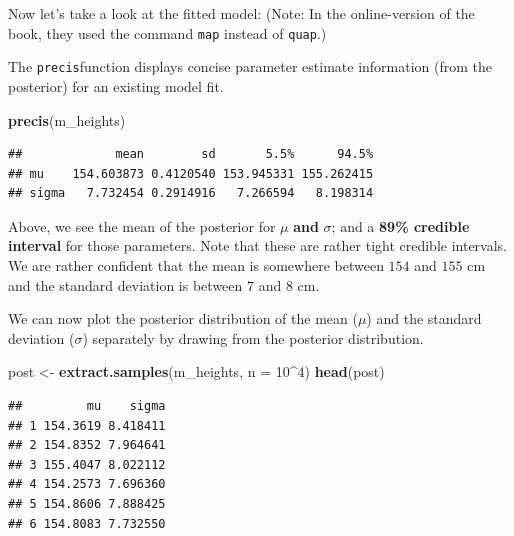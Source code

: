 \documentclass[
]{book}
\newenvironment{Shaded}{\begin{snugshade}}{\end{snugshade}}
\newcommand{\AttributeTok}[1]{\textcolor[rgb]{0.13,0.29,0.53}{#1}}
\newcommand{\DecValTok}[1]{\textcolor[rgb]{0.00,0.00,0.81}{#1}}
\newcommand{\FunctionTok}[1]{\textcolor[rgb]{0.13,0.29,0.53}{\textbf{#1}}}
\newcommand{\NormalTok}[1]{#1}
\newcommand{\OtherTok}[1]{\textcolor[rgb]{0.56,0.35,0.01}{#1}}
\newcommand{\SpecialCharTok}[1]{\textcolor[rgb]{0.81,0.36,0.00}{\textbf{#1}}}
\begin{document}
Now let's take a look at the fitted model:
(Note: In the online-version of the book, they used the command \texttt{map} instead of \texttt{quap}.)

The \texttt{precis}function displays concise parameter estimate information
(from the posterior) for an existing model fit.

\begin{Shaded}
\begin{Highlighting}[]
\FunctionTok{precis}\NormalTok{(m\_heights)}
\end{Highlighting}
\end{Shaded}

\begin{verbatim}
##             mean        sd       5.5%      94.5%
## mu    154.603873 0.4120540 153.945331 155.262415
## sigma   7.732454 0.2914916   7.266594   8.198314
\end{verbatim}

Above, we see the mean of the posterior for \(\mu\) \textbf{and} \(\sigma\);
and a \textbf{89\% credible interval} for those parameters.
Note that these are rather tight credible intervals. We are rather confident that the mean is somewhere between
\(154\) and \(155\) cm and the standard deviation is between \(7\) and \(8\) cm.

We can now plot the posterior distribution of the mean (\(\mu\)) and the standard
deviation (\(\sigma\)) separately by drawing from the posterior distribution.

\begin{Shaded}
\begin{Highlighting}[]
\NormalTok{post }\OtherTok{\textless{}{-}} \FunctionTok{extract.samples}\NormalTok{(m\_heights, }\AttributeTok{n =} \DecValTok{10}\SpecialCharTok{\^{}}\DecValTok{4}\NormalTok{)}
\FunctionTok{head}\NormalTok{(post)}
\end{Highlighting}
\end{Shaded}

\begin{verbatim}
##         mu    sigma
## 1 154.3619 8.418411
## 2 154.8352 7.964641
## 3 155.4047 8.022112
## 4 154.2573 7.696360
## 5 154.8606 7.888425
## 6 154.8083 7.732550
\end{verbatim}

\begin{Shaded}
\end{Shaded}
\end{document}
